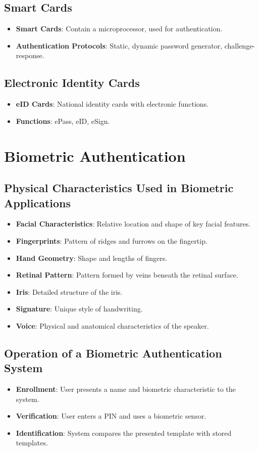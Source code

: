 \documentclass{article}
\begin{document}
\subsection{Smart Cards}
\begin{itemize}
    \item \textbf{Smart Cards}: Contain a microprocessor, used for authentication.
    \item \textbf{Authentication Protocols}: Static, dynamic password generator, challenge-response.
\end{itemize}

\subsection{Electronic Identity Cards}
\begin{itemize}
    \item \textbf{eID Cards}: National identity cards with electronic functions.
    \item \textbf{Functions}: ePass, eID, eSign.
\end{itemize}

\section{Biometric Authentication}
\subsection{Physical Characteristics Used in Biometric Applications}
\begin{itemize}
    \item \textbf{Facial Characteristics}: Relative location and shape of key facial features.
    \item \textbf{Fingerprints}: Pattern of ridges and furrows on the fingertip.
    \item \textbf{Hand Geometry}: Shape and lengths of fingers.
    \item \textbf{Retinal Pattern}: Pattern formed by veins beneath the retinal surface.
    \item \textbf{Iris}: Detailed structure of the iris.
    \item \textbf{Signature}: Unique style of handwriting.
    \item \textbf{Voice}: Physical and anatomical characteristics of the speaker.
\end{itemize}

\subsection{Operation of a Biometric Authentication System}
\begin{itemize}
    \item \textbf{Enrollment}: User presents a name and biometric characteristic to the system.
    \item \textbf{Verification}: User enters a PIN and uses a biometric sensor.
    \item \textbf{Identification}: System compares the presented template with stored templates.
\end{itemize}
\end{document}
